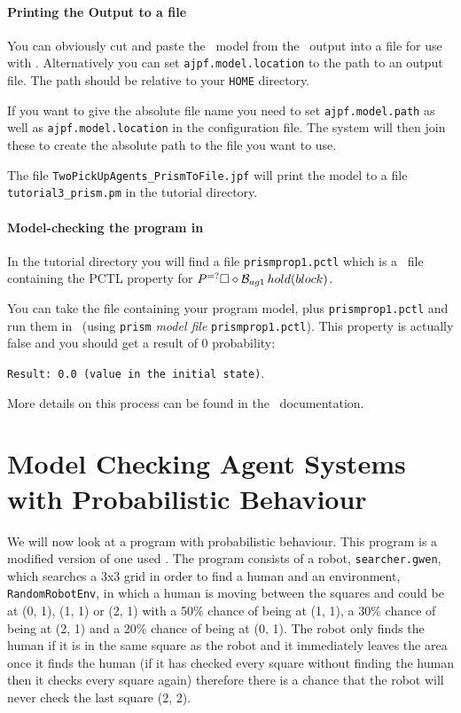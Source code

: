 \paragraph{Printing the Output to a file} You can obviously cut and paste the \prism\ model from the \ajpf\ output into a file for use with \prism.  Alternatively you can set \texttt{ajpf.model.location} to the path to an output file.  The path should be relative to your \texttt{HOME} directory.  

If you want to give the absolute file name you need to set \texttt{ajpf.model.path} as well as \texttt{ajpf.model.location} in the configuration file.  The system will then join these to create the absolute path to the file you want to use.

The file \texttt{TwoPickUpAgents\_PrismToFile.jpf} will print the model to a file \texttt{tutorial3\_prism.pm} in the tutorial directory.

\paragraph{Model-checking the program in \prism}  In the tutorial directory you will find a file \texttt{prismprop1.pctl} which is a \prism\ file containing the PCTL property for $P^{=?}\Box \diamond \mathrm{{\cal B}}_{ag1} \, hold(block)$. 

You can take the file containing  your program model, plus \texttt{prismprop1.pctl} and run them in \prism\ (using \texttt{prism} \emph{model file} \texttt{prismprop1.pctl}).  This property is actually false and you should get a result of 0 probability:

\texttt{Result: 0.0 (value in the initial state)}.

More details on this process can be found in the \prism\ documentation.

\section{Model Checking Agent Systems with Probabilistic Behaviour}

We will now look at a program with probabilistic behaviour.  This program is a modified version of one used . The program consists of a robot, \texttt{searcher.gwen}, which searches a 3x3 grid in order to find a human and an environment, \texttt{RandomRobotEnv}, in which a human is moving between the squares and could be at (0, 1), (1, 1) or (2, 1) with a 50\% chance of being at (1, 1), a 30\% chance of being at (2, 1) and a 20\% chance of being at (0, 1).  The robot only finds the human if it is in the same square as the robot and it immediately leaves the area once it finds the human (if it has checked every square without finding the human then it checks every square again) therefore there is a chance that the robot will never check the last square (2, 2).

